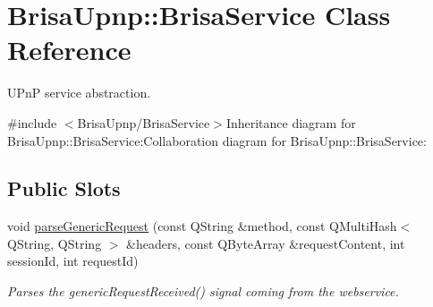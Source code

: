 \hypertarget{classBrisaUpnp_1_1BrisaService}{
\section{BrisaUpnp::BrisaService Class Reference}
\label{classBrisaUpnp_1_1BrisaService}
}


UPnP service abstraction.  


{\ttfamily \#include $<$BrisaUpnp/BrisaService$>$}Inheritance diagram for BrisaUpnp::BrisaService:Collaboration diagram for BrisaUpnp::BrisaService:\subsection*{Public Slots}
\begin{DoxyCompactItemize}
\item 
void \hyperlink{classBrisaUpnp_1_1BrisaService_a8c9ff2ebfd688a97c86139eefd706edc}{parseGenericRequest} (const QString \&method, const QMultiHash$<$ QString, QString $>$ \&headers, const QByteArray \&requestContent, int sessionId, int requestId)
\begin{DoxyCompactList}\small\item\em Parses the genericRequestReceived() signal coming from the webservice. \item\end{DoxyCompactList}\end{DoxyCompactItemize}
